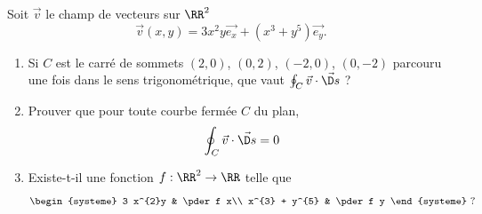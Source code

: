 \documentclass[12pt,french,oneside,a4paper]{memoir} %
\begin{document}
\begin{exo}
Soit $\vec v$ le champ de vecteurs sur $\RR^{2}$
\begin{equation*}
  \vec v(x,y) = 3 x^{2} y \vec{e_{x}} + (x^{3}+y^{5})\vec{e_{y}}.
\end{equation*}
\begin{enumerate}
\item Si $C$ est le carré de sommets $(2,0)$, $(0,2)$, $(-2,0)$, $(0,-2)$ parcouru une fois dans le sens trigonométrique, que vaut $\oint_{C} \vec v \cdot \vec{\D s}$ ?
\item Prouver que pour toute courbe fermée $C$ du plan,
  \begin{equation*}
    \oint_{C}\vec{v} \cdot \vec{\D s} = 0
  \end{equation*}
\item Existe-t-il une fonction $f : \RR^{2} \to \RR$ telle que
  \begin{equation*}
  \begin{systeme}
    3 x^{2}y & \pder f x\\
    x^{3} + y^{5} & \pder f y
  \end{systeme}~?
\end{equation*}
\end{enumerate}
\end{exo}
\end{document}
